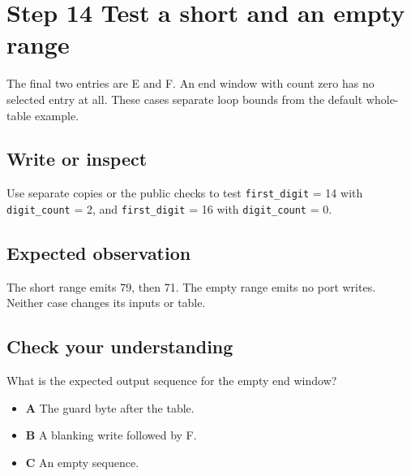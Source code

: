 \section{Step 14 Test a short and an empty
  range}\label{005-seven-segment-counter-s14-step-14-test-a-short-and-an-empty-range}

The final two entries are E and F. An end window with count zero has no
selected entry at all. These cases separate loop bounds from the default
whole-table example.

\subsection{Write or
  inspect}\label{005-seven-segment-counter-s14-write-or-inspect}

Use separate copies or the public checks to test \texttt{first\_digit} =
14 with \texttt{digit\_count} = 2, and \texttt{first\_digit} = 16 with
\texttt{digit\_count} = 0.

\subsection{Expected
  observation}\label{005-seven-segment-counter-s14-expected-observation}

The short range emits 79, then 71. The empty range emits no port writes.
Neither case changes its inputs or table.

\subsection{Check your
  understanding}\label{005-seven-segment-counter-s14-check-your-understanding}

What is the expected output sequence for the empty end window?

\begin{itemize}
  \tightlist
  \item
        \textbf{A} The guard byte after the table.
  \item
        \textbf{B} A blanking write followed by F.
  \item
        \textbf{C} An empty sequence.
\end{itemize}
